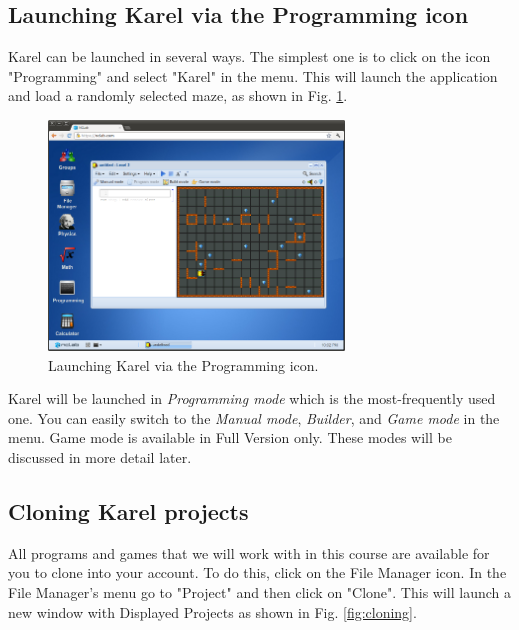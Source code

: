 \documentclass[article,A4,12pt]{llncs}
\begin{document}
\subsection{Launching Karel via the Programming icon}

Karel can be launched in several ways. The simplest one is to click on the icon 
"Programming" and select "Karel" in the menu. This will launch the application 
and load a randomly selected maze, as shown in Fig. \ref{fig:init}.

\begin{figure}[!ht]
\begin{center}
\includegraphics[width=0.7\textwidth]{img/init.png}
\end{center}
\caption{Launching Karel via the Programming icon.}
\label{fig:init}
\end{figure}
\noindent
Karel will be launched in {\em Programming mode} which is the most-frequently 
used one. You can easily switch to the {\em Manual mode}, {\em Builder},
and {\em Game mode} in the menu. Game mode is available in Full Version only. 
These modes will be discussed in more detail later.

\subsection{Cloning Karel projects} \label{cloning}

All programs and games that we will work with in this course are
available for you to clone into your account. To do this, 
click on the File Manager icon. In the File Manager's menu go to 
"Project" and then click on "Clone". This will launch a new window 
with Displayed Projects as shown in Fig. \ref{fig:cloning}.

\newpage
\end{document}
